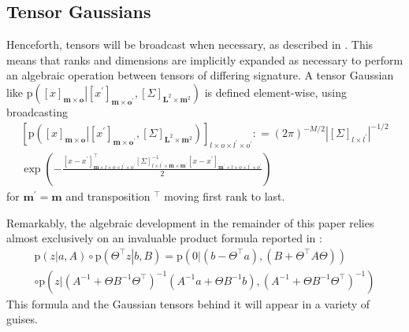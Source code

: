 \documentclass[preprint,12pt]{elsarticle}
\newcommand*{\M}[1]{\ensuremath{#1}\xspace}
\newcommand*{\tr}[1]{\M{#1}}
\newcommand*{\x}{\times}
\newcommand*{\mi}[1]{\mathbf{#1}}
\newcommand*{\te}[2][]{\left\lbrack{#2}\right\rbrack_{#1}}
\newcommand*{\prob}[3]{\M{\mathrm{p}\!\left(\left.{#1}\right\vert{#2,#3}\right)}}
\newcommand*{\deq}{\M{\mathrel{\mathop:}=}}
\newcommand*{\modulus}[1]{\M{\left\lvert{#1}\right\rvert}}
\begin{document}
    \subsection{Tensor Gaussians} \label{sub:GPR:Tensor}
        Henceforth, tensors will be broadcast when necessary, as described in \cite{Numpy2022,Harris2020}. This means that ranks and dimensions are implicitly expanded as necessary to perform an algebraic operation between tensors of differing signature. A tensor Gaussian like $\prob{\te[\mi{m}\x\mi{o}]{x}}{\te[\mi{m}\x\mi{o^{\prime}}]{x^{\prime}}}
        {\te[\mi{L}^{2}\x\mi{m}^{2}]{\Sigma}}$ is defined element-wise, using broadcasting
        \begin{multline} \label{def:Notation:p}
            \te[l\x o \x l^{\prime}\x o^{\prime}]{\prob{\te[\mi{m}\x\mi{o}]{x}}{\te[\mi{m}\x\mi{o^{\prime}}]{x^{\prime}}}
            {\te[\mi{L}^{2}\x\mi{m}^{2}]{\Sigma}}}
            \deq (2 \pi)^{-M/2} \modulus{\te[l\x l^{\prime}]{\Sigma}}^{-1/2} \\
            \exp\left(-\frac{
                \te[\mi{m}\x l\x o\x l^{\prime}\x o^{\prime}]{x-x^{\prime}}^{\intercal} 
            \te[l\x l^{\prime}\x\mi{m\x m^{\prime}}]{\Sigma}^{-1} 
            \te[\mi{m^{\prime}}\x l\x o\x l^{\prime}\x o^{\prime}]{x-x^{\prime}}}
            {2}\right)
        \end{multline}
        for $\mi{m^{\prime}} = \mi{m}$ and transposition $^{\intercal}$ moving first rank to last.

        Remarkably, the algebraic development in the remainder of this paper relies almost exclusively on an invaluable product formula reported in \cite{Rasmussen2016}:
        \begin{multline} \label{eq:GPR:product}
            \prob{z}{a}{A} \circ \prob{\Theta^{\intercal}z}{\tr{b}}{\tr{B}}
            = \prob{0}{(b-\Theta^{\intercal}a)}{(B + \Theta^{\intercal}A\Theta)} \\
            \circ \prob{z}
            {(A^{-1}+\Theta B^{-1}\Theta^{\intercal})^{-1}(A^{-1}a+\Theta B^{-1}b)}
            {(A^{-1}+\Theta B^{-1}\Theta^{\intercal})^{-1}}
        \end{multline}
        This formula and the Gaussian tensors behind it will appear in a variety of guises.
\end{document}
